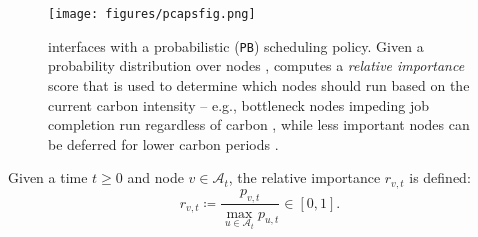 \begin{figure}[t]
    \centering 
    \texttt{[image: figures/pcapsfig.png]} \vspace{-1em}
    \caption{\PCAPS interfaces with a probabilistic (\texttt{PB}) scheduling policy. Given a probability distribution over nodes , \PCAPS computes a \textit{relative importance} score  that is used to determine which nodes should run based on the current carbon intensity  -- e.g., bottleneck nodes impeding job completion run regardless of carbon , while less important nodes can be deferred for lower carbon periods .}
    \label{fig:danish-diagram} 
\end{figure}


 \vspace{-0.5em}
\begin{dfn} \label{dfn:rel-imp}
Given a time $t \geq 0$ and node $v \in \mathcal{A}_t$, the relative importance $r_{v,t}$ is defined:
{\small
\begin{equation*}
    r_{v,t} \coloneqq \frac{p_{v,t}}{\max_{u \in \mathcal{A}_t} p_{u,t}} \in [0,1].
\end{equation*}}
\end{dfn}
 \vspace{-0.5em}

